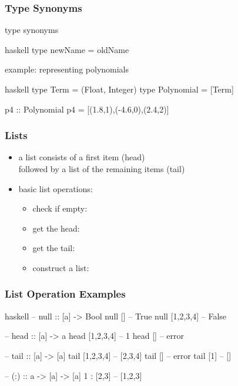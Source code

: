\documentclass[dvipsnames]{beamer}
\theoremstyle{plain}
\begin{document}
\begin{frame}[fragile]
  \frametitle{Type Synonyms}

  \begin{block}{type synonyms}
    \begin{pygments}{haskell}
type newName = oldName
    \end{pygments}
  \end{block}

  \begin{exampleblock}{example: representing polynomials}
    \begin{pygments}{haskell}
type Term = (Float, Integer)
type Polynomial = [Term]

p4 :: Polynomial
p4 = [(1.8,1),(-4.6,0),(2.4,2)]
    \end{pygments}
  \end{exampleblock}
\end{frame}

\begin{frame}
  \frametitle{Lists}

  \begin{itemize}
    \item a list consists of a first item (\alert{head})\\
      followed by a list of the remaining items (\alert{tail})

  \medskip
    \item basic list operations:
      \begin{itemize}
        \item check if empty: 
        \item get the head: 
        \item get the tail: 
        \item construct a list: 
      \end{itemize}
  \end{itemize}
\end{frame}

\begin{frame}[fragile]
  \frametitle{List Operation Examples}

  \begin{exampleblock}{}
    \begin{pygments}{haskell}
-- null :: [a] -> Bool
null []        -- True
null [1,2,3,4] -- False

-- head :: [a] -> a
head [1,2,3,4] -- 1
head []        -- error

-- tail :: [a] -> [a]
tail [1,2,3,4] -- [2,3,4]
tail []        -- error
tail [1]       -- []

-- (:) :: a -> [a] -> [a]
1 : [2,3]      -- [1,2,3]
    \end{pygments}
  \end{exampleblock}
\end{frame}
\end{document}
